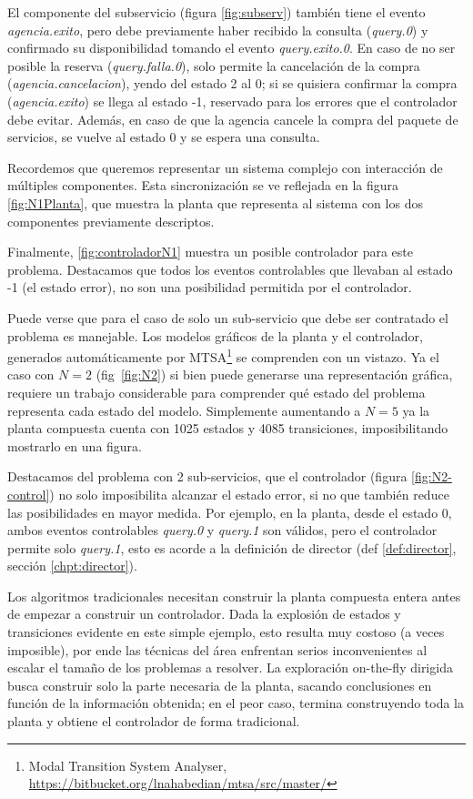 El componente del subservicio (figura \ref{fig:subserv}) también tiene el evento \textit{agencia.exito}, pero debe previamente haber recibido la consulta (\textit{query.0}) y confirmado su disponibilidad tomando el evento \textit{query.exito.0}. En caso de no ser posible la reserva (\textit{query.falla.0}), solo permite la cancelación de la compra (\textit{agencia.cancelacion}), yendo del estado 2 al 0; si se quisiera confirmar la compra (\textit{agencia.exito}) se llega al estado -1, reservado para los errores que el controlador debe evitar. Además, en caso de que la agencia cancele la compra del paquete de servicios, se vuelve al estado 0 y se espera una consulta.

Recordemos que queremos representar un sistema complejo con interacción de múltiples componentes. Esta sincronización se ve reflejada en la figura \ref{fig:N1Planta}, que muestra la planta que representa al sistema con los dos componentes previamente descriptos. 

Finalmente, \ref{fig:controladorN1} muestra un posible controlador para este problema. Destacamos que todos los eventos controlables que llevaban al estado -1 (el estado error), no son una posibilidad permitida por el controlador. 

Puede verse que para el caso de solo un sub-servicio que debe ser contratado el problema es manejable. Los modelos gráficos de la planta y el controlador, generados automáticamente por MTSA\footnote{Modal Transition System Analyser, \href{https://bitbucket.org/lnahabedian/mtsa/src/master/^}{https://bitbucket.org/lnahabedian/mtsa/src/master/}} se comprenden con un vistazo. Ya el caso con $N=2$ (fig~\ref{fig:N2}) si bien puede generarse una representación gráfica, requiere un trabajo considerable para comprender qué estado del problema representa cada estado del modelo. Simplemente aumentando a $N=5$ ya la planta compuesta cuenta con 1025 estados y 4085 transiciones, imposibilitando mostrarlo en una figura. 

Destacamos del problema con 2 sub-servicios, que el controlador (figura \ref{fig:N2-control}) no solo imposibilita alcanzar el estado error, si no que también reduce las posibilidades en mayor medida. Por ejemplo, en la planta, desde el estado 0, ambos eventos controlables \textit{query.0} y \textit{query.1} son válidos, pero el controlador permite solo \textit{query.1}, esto es acorde a la definición de director (def \ref{def:director}, sección \ref{chpt:director}).

Los algoritmos tradicionales necesitan construir la planta compuesta entera antes de empezar a construir un controlador. Dada la explosión de estados y transiciones evidente en este simple ejemplo, esto resulta muy costoso (a veces imposible), por ende las técnicas del área enfrentan serios inconvenientes al escalar el tamaño de los problemas a resolver. La exploración on-the-fly dirigida busca construir solo la parte  necesaria de la planta, sacando conclusiones en función de la información obtenida; en el peor caso, termina construyendo toda la planta y obtiene el controlador de forma tradicional.








